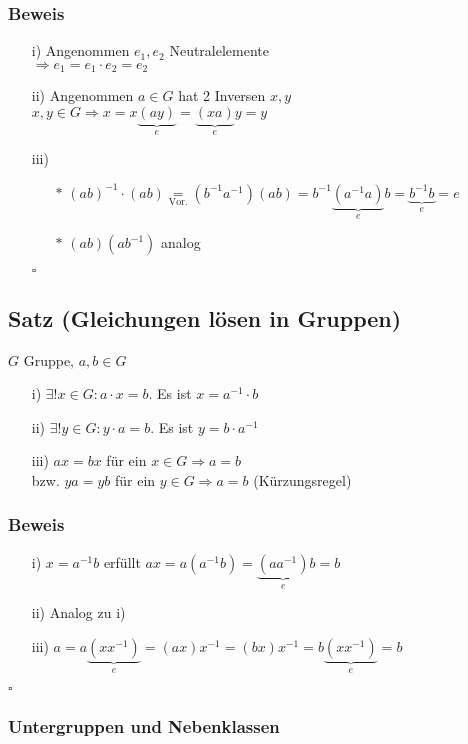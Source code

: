 \documentclass[12pt,titlepage, pdf]{article}
\renewcommand{\>}{\rightarrow}
\renewcommand{\*}{\cdot}
\begin{document}
\subsubsection*{Beweis}
\begin{itemize}
	\item[i)] Angenommen $e_1,e_2$ Neutralelemente \\
	$\Rightarrow e_1 = e_1 \cdot e_2 = e_2$
	\item[ii)] Angenommen $a \in G$ hat 2 Inversen $x,y$\\
	 $x,y \in G \Rightarrow x = x\underbrace{(ay)}_{e} = \underbrace{(xa)}_e y = y$
	\item[iii)] 
	\begin{itemize}
		\item[$\ast$] $(ab)^{-1} \cdot (ab) \underset{\textrm{Vor.}}{=} (b^{-1}a^{-1})(ab) = b^{-1}\underbrace{(a^{-1}a)}_e b = \underbrace{b^{-1}b}_e = e$
		\item[$\ast$] $(ab)(ab^{-1})$ analog
	\end{itemize}
\hfill$\square$
\end{itemize}
\subsection{Satz (Gleichungen lösen in Gruppen)}
$G$ Gruppe, $a,b \in G$
\begin{itemize}
	\item[i)] $\exists! x \in G: a \cdot x = b$. \quad Es ist $x = a^{-1} \cdot b$
	\item[ii)] $\exists! y \in G: y \cdot a = b$. \quad Es ist $y = b \cdot a^{-1}$
	\item[iii)] $ax = bx$ für ein $x \in G \Rightarrow a = b$\\
	bzw. $ya = yb$ für ein $y \in G \Rightarrow a = b$ (Kürzungsregel)
\end{itemize}
\subsubsection*{Beweis}
\begin{itemize}
	\item[i)] $x = a^{-1}b$ erfüllt $ax = a(a^{-1}b) = \underbrace{(aa^{-1})}_e b = b$
	\item[ii)] Analog zu i)
	\item[iii)] $a = a\underbrace{(xx^{-1})}_{e} = (ax)x^{-1} = (bx)x^{-1} = b\underbrace{(xx^{-1})}_{e} = b$ 
\end{itemize}
\hfill$\square$
\subsubsection*{Untergruppen und Nebenklassen}
\end{document}
